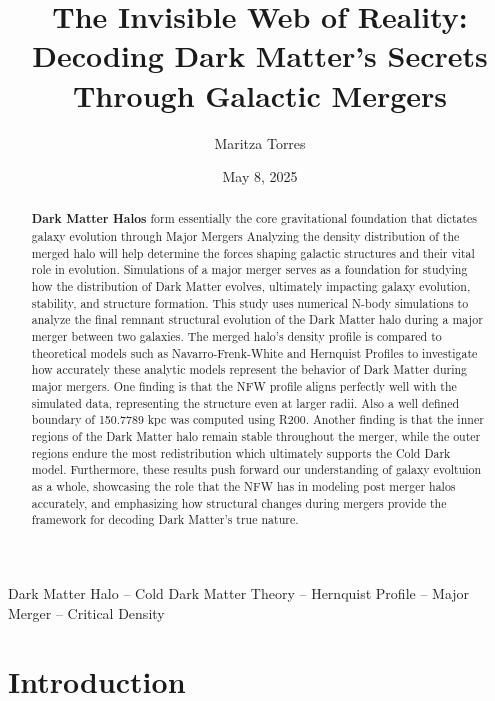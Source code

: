\documentclass[fleqn,usenatbib]{mnras}
\title {The Invisible Web of Reality: Decoding Dark Matter's Secrets Through Galactic Mergers}
\author {Maritza Torres}
\date{May 8, 2025}
\begin{document}
\label{firstpage}
\pagerange{\pageref{firstpage}--\pageref{lastpage}}
\maketitle


\begin{abstract}
\textbf{Dark Matter Halos} form essentially the core gravitational foundation that dictates galaxy evolution through Major Mergers \citep{2019MNRAS.487..993D} Analyzing the density distribution of the merged halo will help determine the forces shaping galactic structures and their vital role in evolution. Simulations of a major merger serves as a foundation for studying how the distribution of Dark Matter evolves, ultimately impacting galaxy evolution, stability, and structure formation. This study uses numerical N-body simulations to analyze the final remnant structural evolution of the Dark Matter halo during a major merger between two galaxies. The merged halo's density profile is compared to theoretical models such as Navarro-Frenk-White and Hernquist Profiles to investigate how accurately these analytic models represent the behavior of Dark Matter during major mergers. One finding is that the NFW profile aligns perfectly well with the simulated data, representing the structure even at larger radii. Also a well defined boundary of 150.7789 kpc was computed using R200. Another finding is that the inner regions of the Dark Matter halo remain stable throughout the merger, while the outer regions endure the most redistribution which ultimately supports the Cold Dark model. Furthermore, these results push forward our understanding of galaxy evoltuion as a whole, showcasing the role that the NFW has in modeling post merger halos accurately, and emphasizing how structural changes during mergers provide the framework for decoding Dark Matter's true nature.

\end{abstract}



\begin{keywords}
Dark Matter Halo -- Cold Dark Matter Theory -- Hernquist Profile -- Major Merger -- Critical Density  
\end{keywords} 

\section{Introduction}
\end{document}
